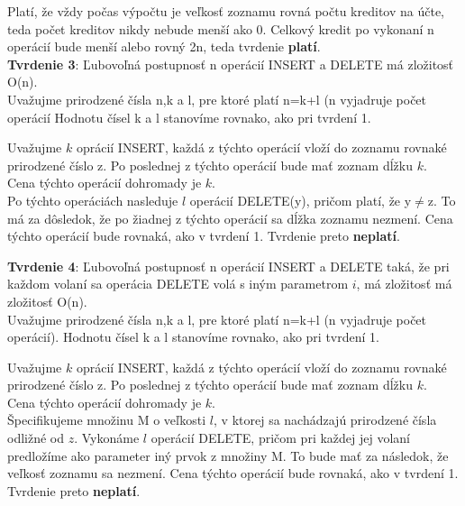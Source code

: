\documentclass[paper=a4, fontsize=11pt]{scrartcl} %
\numberwithin{equation}{section} %
\numberwithin{figure}{section} %
\numberwithin{table}{section} %
\begin{document}
Platí, že vždy počas výpočtu je veľkosť zoznamu rovná počtu kreditov na účte, teda počet kreditov nikdy nebude menší ako 0.
Celkový kredit po vykonaní n operácií bude menší alebo rovný 2n, teda tvrdenie \textbf{platí}. \\


\textbf{Tvrdenie 3}: Ľubovoľná postupnosť n operácií INSERT a DELETE má zložitosť O(n). \\

Uvažujme prirodzené čísla n,k a l, pre ktoré platí n=k+l (n vyjadruje počet operácií
Hodnotu čísel k a l stanovíme rovnako, ako pri tvrdení 1.

Uvažujme $k$ oprácií INSERT, každá z týchto operácií vloží do zoznamu rovnaké prirodzené číslo z.
Po poslednej z týchto operácií bude mať zoznam dĺžku $k$. \\

Cena týchto operácií dohromady je $k$. \\

Po týchto operáciách nasleduje $l$ operácií DELETE(y), pričom platí, že y$\neq$z. To má za dôsledok, že po žiadnej z týchto operácií sa dĺžka zoznamu nezmení. Cena týchto operácií bude rovnaká, ako v tvrdení 1.
Tvrdenie preto \textbf{neplatí}.

\textbf{Tvrdenie 4}: Ľubovoľná postupnosť n operácií INSERT a DELETE taká, že pri každom volaní sa operácia DELETE volá s iným parametrom $i$, má zložitosť má zložitosť O(n). \\

Uvažujme prirodzené čísla n,k a l, pre ktoré platí n=k+l (n vyjadruje počet operácií).
Hodnotu čísel k a l stanovíme rovnako, ako pri tvrdení 1.

Uvažujme $k$ oprácií INSERT, každá z týchto operácií vloží do zoznamu rovnaké prirodzené číslo z.
Po poslednej z týchto operácií bude mať zoznam dĺžku $k$. \\

Cena týchto operácií dohromady je $k$. \\

Špecifikujeme množinu M o veľkosti $l$, v ktorej sa nachádzajú prirodzené čísla odližné od $z$.
Vykonáme $l$ operácií DELETE, pričom pri každej jej volaní predložíme ako parameter iný prvok z množiny M.
To bude mať za následok, že veľkosť zoznamu sa nezmení. Cena týchto operácií bude rovnaká, ako v tvrdení 1.
Tvrdenie preto \textbf{neplatí}.





\pagebreak
\end{document}
